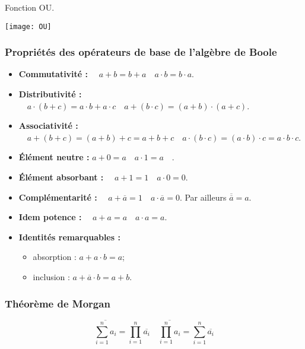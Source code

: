 \begin{exemple}
Fonction OU.


\begin{center}
\texttt{[image: OU]}
\end{center}
\end{exemple}

\subsubsection{Propriétés des opérateurs de base de l'algèbre de Boole}

\begin{prop} 

\begin{itemize}
\item \textbf{Commutativité :} $\quad a+b = b+a \quad a\cdot b = b\cdot a$.
\item \textbf{Distributivité :} $\quad a\cdot (b+c) = a\cdot b+a \cdot c \quad  a+(b\cdot c) = (a+b) \cdot (a+c)$.
\item \textbf{Associativité :} $\quad a + (b+c) = (a+b)+c = a+b+c \quad a \cdot (b\cdot c) = (a\cdot b)\cdot c = a \cdot b\cdot c$.
\item \textbf{Élément neutre :} $ a + 0 = a \quad a\cdot 1 = a \quad$.
\item \textbf{Élément absorbant :} $\quad  a + 1 = 1 \quad a\cdot 0 = 0$.
\item \textbf{Complémentarité :} $ \quad a + \overline{a} = 1\quad  a\cdot \overline{a} = 0$.
Par ailleurs $\overline{\overline{a}}=a$.
\item \textbf{Idem potence :} $\quad a + a = a \quad a\cdot a = a$.
\item \textbf{Identités remarquables :}
\begin{itemize} 
\item absorption : $ a + a\cdot b = a$;
\item inclusion : $a+\overline{a}\cdot b = a+b$.
\end{itemize}
\end{itemize}
\end{prop}

\subsubsection{Théorème de Morgan}
\begin{theorem}
$$
\overline{\sum\limits_{i=1}^{n} a_i} = \prod\limits_{i=1}^n \overline{a_i}
\quad
\overline{\prod\limits_{i=1}^{n} a_i} = \sum\limits_{i=1}^n \overline{a_i}
$$
\end{theorem}

